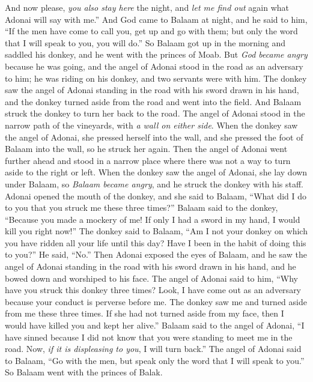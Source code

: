 \begin{biblechapter}
\verse And now please, \textit{you also stay here} the night, and \textit{let me find out} again what Adonai will say with me.”
\verse And God came to Balaam at night, and he said to him, “If the men have come to call you, get up and go with them; but only the word that I will speak to you, you will do.”
\verse So Balaam got up in the morning and saddled his donkey, and he went with the princes of Moab.
 But \textit{God became angry} because he was going, and the angel of Adonai stood in the road as an adversary to him; he was riding on his donkey, and two servants were with him.
\verse The donkey saw the angel of Adonai standing in the road with his sword drawn in his hand, and the donkey turned aside from the road and went into the field. And Balaam struck the donkey to turn her back to the road.
\verse The angel of Adonai stood in the narrow path of the vineyards, with \textit{a wall on either side}.
\verse When the donkey saw the angel of Adonai, she pressed herself into the wall, and she pressed the foot of Balaam into the wall, so he struck her again.
\verse Then the angel of Adonai went further ahead and stood in a narrow place where there was not a way to turn aside to the right or left.
\verse When the donkey saw the angel of Adonai, she lay down under Balaam, so \textit{Balaam became angry}, and he struck the donkey with his staff.
\verse Adonai opened the mouth of the donkey, and she said to Balaam, “What did I do to you that you struck me these three times?”
\verse Balaam said to the donkey, “Because you made a mockery of me! If only I had a sword in my hand, I would kill you right now!”
\verse The donkey said to Balaam, “Am I not your donkey on which you have ridden all your life until this day? Have I been in the habit of doing this to you?” He said, “No.”
\verse Then Adonai exposed the eyes of Balaam, and he saw the angel of Adonai standing in the road with his sword drawn in his hand, and he bowed down and worshiped to his face.
\verse The angel of Adonai said to him, “Why have you struck this donkey three times? Look, I have come out as an adversary because your conduct is perverse before me.
\verse The donkey saw me and turned aside from me these three times. If she had not turned aside from my face, then I would have killed you and kept her alive.”
\verse Balaam said to the angel of Adonai, “I have sinned because I did not know that you were standing to meet me in the road. Now, \textit{if it is displeasing to you}, I will turn back.”
\verse The angel of Adonai said to Balaam, “Go with the men, but speak only the word that I will speak to you.” So Balaam went with the princes of Balak.

\end{biblechapter}
